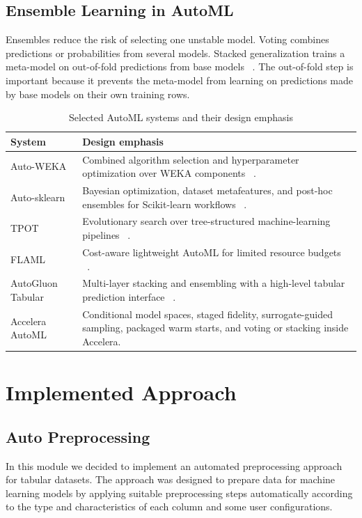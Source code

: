 \documentclass[12pt,a4paper]{report}
\begin{document}
\subsection{Ensemble Learning in AutoML}
Ensembles reduce the risk of selecting one unstable model. Voting combines
predictions or probabilities from several models. Stacked generalization trains
a meta-model on out-of-fold predictions from base models ~\cite{stacking}. The
out-of-fold step is important because it prevents the meta-model from learning
on predictions made by base models on their own training rows.

\begin{table}[H]
\centering
\caption{Selected AutoML systems and their design emphasis}
\label{tab:automl_related_systems}
\renewcommand{\arraystretch}{1.15}
\begin{tabularx}{\textwidth}{>{\raggedright\arraybackslash}p{}X}
\toprule
\textbf{System} & \textbf{Design emphasis} \\
\midrule
Auto-WEKA & Combined algorithm selection and hyperparameter optimization over
WEKA components ~\cite{autoweka}. \\
Auto-sklearn & Bayesian optimization, dataset metafeatures, and post-hoc
ensembles for Scikit-learn workflows ~\cite{autosklearn}. \\
TPOT & Evolutionary search over tree-structured machine-learning pipelines
~\cite{tpot}. \\
FLAML & Cost-aware lightweight AutoML for limited resource budgets
~\cite{flaml}. \\
AutoGluon Tabular & Multi-layer stacking and ensembling with a high-level
tabular prediction interface ~\cite{autogluon}. \\
Accelera AutoML & Conditional model spaces, staged fidelity,
surrogate-guided sampling, packaged warm starts, and voting or stacking inside
Accelera. \\
\bottomrule
\end{tabularx}
\end{table}

\section{Implemented Approach}

\subsection{Auto Preprocessing}
In this module we decided to implement an automated preprocessing approach for tabular datasets. The
approach was designed to prepare data for machine learning models by applying
suitable preprocessing steps automatically according to the type and
characteristics of each column and some user configurations.
\end{document}

